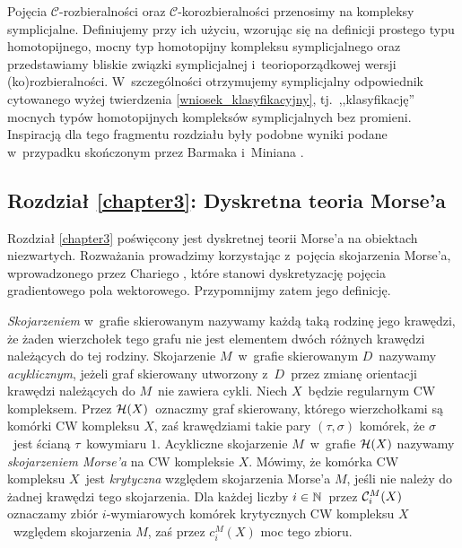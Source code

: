 Pojęcia $\mathcal{C}$-rozbieralności oraz $\mathcal{C}$-korozbieralności przenosimy na kompleksy symplicjalne. Definiujemy przy ich użyciu, wzorując się na definicji prostego typu homotopijnego, mocny typ homotopijny kompleksu symplicjalnego oraz przedstawiamy bliskie związki symplicjalnej i~teorioporządkowej wersji (ko)rozbieralności. W~szczególności otrzymujemy symplicjalny odpowiednik cytowanego wyżej twierdzenia \ref{wniosek_klasyfikacyjny}, tj.~,,klasyfikację'' mocnych typów homotopijnych kompleksów symplicjalnych bez promieni. Inspiracją dla tego fragmentu rozdziału były podobne wyniki podane w~przypadku skończonym przez Barmaka i~Miniana \cite{Barmak12}.

\subsection*{Rozdział \ref{chapter3}: Dyskretna teoria Morse'a}
Rozdział \ref{chapter3} poświęcony jest dyskretnej teorii Morse'a na obiektach niezwartych. Rozważania prowadzimy korzystając z~pojęcia skojarzenia Morse'a, wprowadzonego przez Chariego \cite{Chari00}, które stanowi dyskretyzację pojęcia gradientowego pola wektorowego. Przypomnijmy zatem jego definicję.

\textit{Skojarzeniem} w~grafie skierowanym nazywamy każdą taką rodzinę jego krawędzi, że żaden wierzchołek tego grafu nie jest elementem dwóch różnych krawędzi należących do tej rodziny. Skojarzenie $M$~w~grafie skierowanym $D$~nazywamy \textit{acyklicznym}, jeżeli graf skierowany utworzony z~$D$~przez zmianę orientacji krawędzi należących do $M$~nie zawiera cykli. 
Niech $X$~będzie regularnym CW kompleksem. Przez $\mathcal{H}(X)$~oznaczmy graf skierowany, którego wierzchołkami są komórki CW kompleksu $X$, zaś krawędziami takie pary $(\tau,\sigma)$ komórek, że $\sigma$~jest ścianą $\tau$~kowymiaru $1$. Acykliczne skojarzenie $M$~w~grafie $\mathcal{H}(X)$ nazywamy \textit{skojarzeniem Morse'a} na CW kompleksie $X$. Mówimy, że komórka CW kompleksu $X$~jest \textit{krytyczna} względem skojarzenia Morse'a $M$, jeśli nie należy do żadnej krawędzi tego skojarzenia. Dla każdej liczby $i\in\mathbb{N}$~przez $\mathcal{C}^M_i(X)$ oznaczamy zbiór \mbox{$i$-wymiarowych} komórek krytycznych CW kompleksu $X$~względem skojarzenia $M$, zaś przez  $c_i^M(X)$ moc tego zbioru. 

